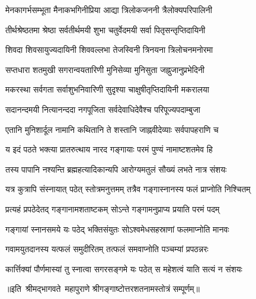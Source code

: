 \twolineshloka
{मेनकागर्भसम्भूता मैनाकभगिनीप्रिया}
{आद्या त्रिलोकजननी त्रैलोक्यपरिपालिनी}

\twolineshloka
{तीर्थश्रेष्ठतमा श्रेष्ठा सर्वतीर्थमयी शुभा}
{चतुर्वेदमयी सर्वा पितृसन्तृप्तिदायिनी}

\twolineshloka
{शिवदा शिवसायुज्यदायिनी शिववल्लभा}
{तेजस्विनी त्रिनयना त्रिलोचनमनोरमा}

\twolineshloka
{सप्तधारा शतमुखी सगरान्वयतारिणी}
{मुनिसेव्या मुनिसुता जह्नुजानुप्रभेदिनी}

\twolineshloka
{मकरस्था सर्वगता सर्वाशुभनिवारिणी}
{सुदृश्या चाक्षुषीतृप्तिदायिनी मकरालया}

\twolineshloka
{सदानन्दमयी नित्यानन्ददा नगपूजिता}
{सर्वदेवाधिदेवैश्च परिपूज्यपदाम्बुजा}

\twolineshloka
{एतानि मुनिशार्दूल नामानि कथितानि ते}
{शस्तानि जाह्नवीदेव्याः सर्वपापहराणि च}

\twolineshloka
{य इदं पठते भक्त्या प्रातरुत्थाय नारद}
{गङ्गायाः परमं पुण्यं नामाष्टशतमेव हि}

\twolineshloka
{तस्य पापानि नश्यन्ति ब्रह्महत्यादिकान्यपि}
{आरोग्यमतुलं सौख्यं लभते नात्र संशयः}

\twolineshloka
{यत्र कुत्रापि संस्नायात् पठेत् स्तोत्रमनुत्तमम्}
{तत्रैव गङ्गास्नानस्य फलं प्राप्नोति निश्चितम्}

\twolineshloka
{प्रत्यहं प्रपठेदेतद् गङ्गानामशताष्टकम्}
{सोऽन्ते गङ्गामनुप्राप्य प्रयाति परमं पदम्}

\twolineshloka
{गङ्गायां स्नानसमये यः पठेद् भक्तिसंयुतः}
{सोऽश्वमेधसहस्राणां फलमाप्नोति मानवः}

\twolineshloka
{गवामयुतदानस्य यत्फलं समुदीरितम्}
{तत्फलं समवाप्नोति पञ्चम्यां प्रपठन्नरः}

\twolineshloka
{कार्त्तिक्यां पौर्णमास्यां तु स्नात्वा सगरसङ्गमे}
{यः पठेत् स महेशत्वं याति सत्यं न संशयः}

{॥इति~श्रीमद्भागवते~महापुराणे श्रीगङ्गाष्टोत्तरशतनामस्तोत्रं सम्पूर्णम्॥}
